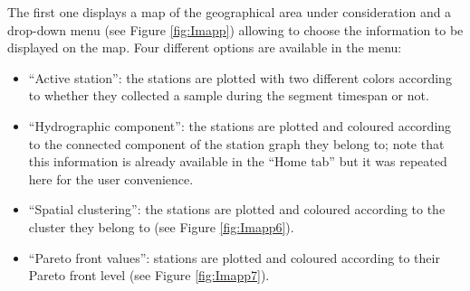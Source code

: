 The first one displays a map of the geographical area under consideration and a drop-down menu (see Figure \ref{fig:Imapp}) allowing to choose the information to be displayed on the map. Four different options are available in the menu:
\begin{itemize}
\item ``Active station'': the stations are plotted with two different colors according to whether they collected a sample during the segment timespan or not.
\item ``Hydrographic component'': the stations are plotted and coloured according to the connected component of the station graph they belong to; note that this information is already available in the ``Home tab'' but it was repeated here for the user convenience.
\item ``Spatial clustering'':  the stations are plotted and coloured according to the cluster they belong to (see Figure \ref{fig:Imapp6}).
\item ``Pareto front values'': stations are plotted and coloured according to their Pareto front level (see Figure \ref{fig:Imapp7}). 
\end{itemize}
   
